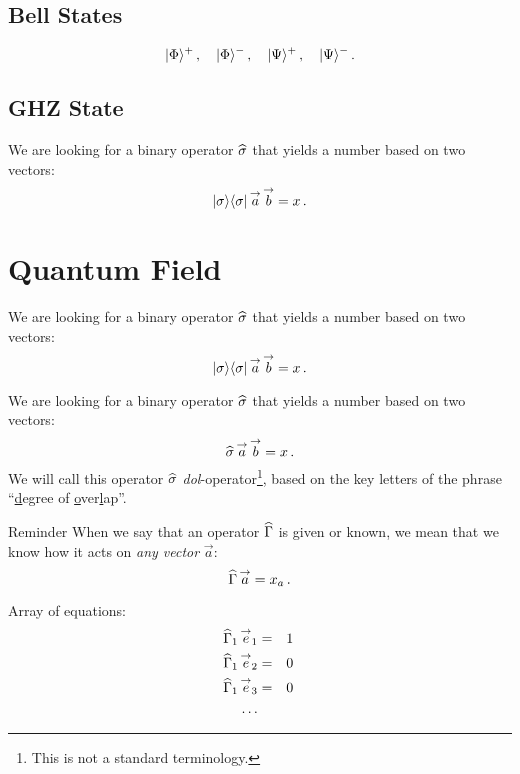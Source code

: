 \subsection{Bell States}
\[
|{\Phi}\rangle^{+}\,,\quad|{\Phi}\rangle^{-}\,,\quad
|{\Psi}\rangle^{+}\,,\quad|{\Psi}\rangle^{-}\,.
\]


\subsection{GHZ State}\label{sec:GHZState}
We are looking for a binary operator $\widehat{\sigma}$ that yields a number
based on two vectors:
\[
|{\sigma}\rangle\langle{\sigma}|\,\overset{\rightarrow}{a}\,\overset{\rightarrow}{b}=x\,.
\]


\section{Quantum Field}\label{sec:QuantumField}
We are looking for a binary operator $\widehat{\sigma}$ that yields a number
based on two vectors:
\[
|{\sigma}\rangle\langle{\sigma}|\,\overset{\rightarrow}{a}\,\overset{\rightarrow}{b}=x\,.
\]

We are looking for a binary operator $\widehat{\sigma}$ that yields a number
based on two vectors:
\[
\widehat{\sigma}\,\overset{\rightarrow}{a}\,\overset{\rightarrow}{b}=x\,.
\]
We will call this operator $\widehat{\sigma}$ \emph{dol}-operator\footnote{This is not a
standard terminology. }, based on the key letters of the phrase
``\underline{d}egree of \underline{o}ver\underline{l}ap''.

\begin{myrem}{Reminder}
When we say that an operator $\widehat{\Gamma}$ is given or known, we
mean that we know how it acts on \emph{any vector} $\vec{a}$:
\[
\widehat{\Gamma}\,\overset{\rightarrow}{a} = x_a\,.
\]
\end{myrem}

Array of equations:
\begin{eqnarray}
  \widehat{\Gamma}_1\,\overset{\rightarrow}{e}_1 & = & 1\,\\
  \widehat{\Gamma}_1\,\overset{\rightarrow}{e}_2 & = & 0\,\\
  \widehat{\Gamma}_1\,\overset{\rightarrow}{e}_3 & = & 0\,\\
  \ldots
\end{eqnarray}

